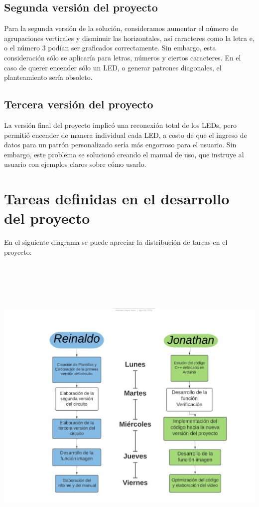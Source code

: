 \documentclass{article}
\begin{document}
\subsection{Segunda versión del proyecto}
Para la segunda versión de la solución, consideramos aumentar el número de agrupaciones verticales y disminuir las horizontales, así caracteres como la letra e, o el número 3 podían ser graficados correctamente. Sin embargo, esta consideración sólo se aplicaría para letras, números y ciertos caracteres. En el caso de querer encender sólo un LED, o generar patrones diagonales, el planteamiento sería obsoleto.

\subsection{Tercera versión del proyecto}
La versión final del proyecto implicó una reconexión total de los LEDs, pero permitió encender de manera individual cada LED, a costo de que el ingreso de datos para un patrón personalizado sería más engorroso para el usuario. Sin embargo, este problema se solucionó creando el manual de uso, que instruye al usuario con ejemplos claros sobre cómo usarlo.



\section{Tareas definidas en el desarrollo del proyecto} \label{contenido}
En el siguiente diagrama se puede apreciar la distribución de tareas en el proyecto:

\includegraphics[width=15cm, height=15cm]{Tareas.jpeg}
\end{document}
